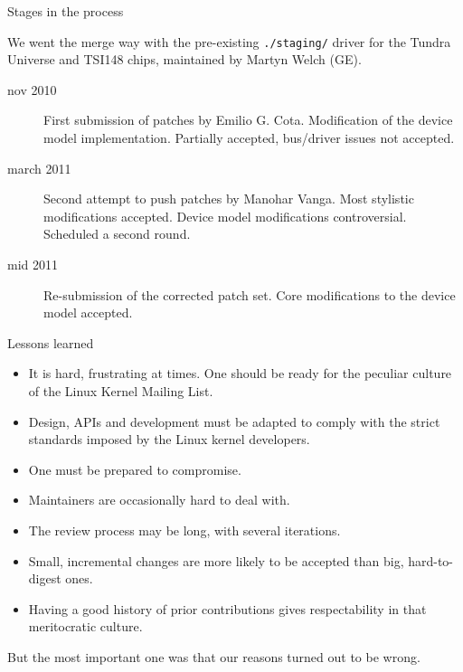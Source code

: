 \documentclass{beamer}
\begin{document}
\begin{frame}{Stages in the process}

We went the merge way with the pre-existing \texttt{./staging/}
driver for the Tundra Universe and TSI148 chips,
maintained by Martyn Welch (GE).

\begin{description}
\item[nov 2010] First submission of patches by Emilio G. Cota.
    Modification of the device model implementation. Partially accepted,
    bus/driver issues not accepted.
\item[march 2011] Second attempt to push patches by Manohar Vanga.
    Most stylistic modifications accepted. Device model modifications
    controversial. Scheduled a second round.
\item[mid 2011] Re-submission of the corrected patch set. Core
    modifications to the device model accepted.
\end{description}
\end{frame}

\begin{frame}{Lessons learned}
\begin{itemize}
\item It is hard, frustrating at times. One should be ready for the
    peculiar culture of the Linux Kernel Mailing List.
\item Design, APIs and development must be adapted to comply with the strict
    standards imposed by the Linux kernel developers.
\item One must be prepared to compromise.
\item Maintainers are occasionally hard to deal with.
\item The review process may be long, with several iterations.
\item Small, incremental changes are more likely to be accepted than
    big, hard-to-digest ones.
\item Having a good history of prior contributions gives respectability
    in that meritocratic culture.
\end{itemize}

But the most important one was that our reasons turned out to be wrong.
\end{frame}
\end{document}
